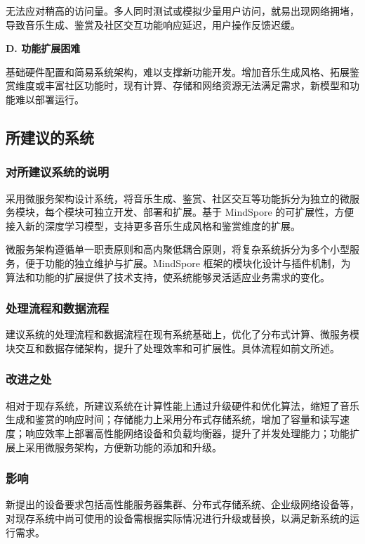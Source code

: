 \documentclass{base}
\numberwithin{figure}{section} %
\begin{document}
无法应对稍高的访问量。多人同时测试或模拟少量用户访问，就易出现网络拥堵，导致音乐生成、鉴赏及社区交互功能响应延迟，用户操作反馈迟缓。​

\textbf{D. 功能扩展困难​}

基础硬件配置和简易系统架构，难以支撑新功能开发。增加音乐生成风格、拓展鉴赏维度或丰富社区功能时，现有计算、存储和网络资源无法满足需求，新模型和功能难以部署运行。

\subsection{所建议的系统}

\subsubsection{对所建议系统的说明}

采用微服务架构设计系统，将音乐生成、鉴赏、社区交互等功能拆分为独立的微服务模块，每个模块可独立开发、部署和扩展。基于 MindSpore 的可扩展性，方便接入新的深度学习模型，支持更多音乐生成风格和鉴赏维度的扩展。​

微服务架构遵循单一职责原则和高内聚低耦合原则，将复杂系统拆分为多个小型服务，便于功能的独立维护与扩展。MindSpore 框架的模块化设计与插件机制，为算法和功能的扩展提供了技术支持，使系统能够灵活适应业务需求的变化。

\subsubsection{处理流程和数据流程}

建议系统的处理流程和数据流程在现有系统基础上，优化了分布式计算、微服务模块交互和数据存储架构，提升了处理效率和可扩展性。具体流程如前文所述。

\subsubsection{改进之处}

相对于现存系统，所建议系统在计算性能上通过升级硬件和优化算法，缩短了音乐生成和鉴赏的响应时间；存储能力上采用分布式存储系统，增加了容量和读写速度；响应效率上部署高性能网络设备和负载均衡器，提升了并发处理能力；功能扩展上采用微服务架构，方便新功能的添加和升级。

\subsubsection{影响}

新提出的设备要求包括高性能服务器集群、分布式存储系统、企业级网络设备等，对现存系统中尚可使用的设备需根据实际情况进行升级或替换，以满足新系统的运行需求。
\end{document}
